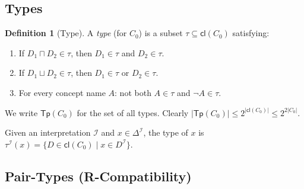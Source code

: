 \documentclass[a4paper,11pt]{article}
\theoremstyle{definition}
\newtheorem{definition}[theorem]{Definition}
\newcommand{\DeltaI}{\ensuremath{\Delta^{\mathcal{I}}}}
\newcommand{\interp}{\ensuremath{\mathcal{I}}}
\newcommand{\cl}{\ensuremath{\mathsf{cl}}}
\newcommand{\Tp}{\ensuremath{\mathsf{Tp}}}
\begin{document}
\subsection{Types}

\begin{definition}[Type]
\label{def:type}
A \emph{type} (for $C_0$) is a subset $\tau \subseteq \cl(C_0)$
satisfying:
\begin{enumerate}[label=(T\arabic*),nosep]
  \item If $D_1 \sqcap D_2 \in \tau$, then $D_1 \in \tau$ and $D_2 \in \tau$.
  \item If $D_1 \sqcup D_2 \in \tau$, then $D_1 \in \tau$ or $D_2 \in \tau$.
  \item For every concept name $A$: not both $A \in \tau$ and $\neg A \in \tau$.
\end{enumerate}
We write $\Tp(C_0)$ for the set of all types.  Clearly $|\Tp(C_0)|
\leq 2^{|\cl(C_0)|} \leq 2^{2|C_0|}$.
\end{definition}

Given an interpretation $\interp$ and $x \in \DeltaI$, the type of
$x$ is $\tau^{\interp}(x) = \{D \in \cl(C_0) \mid x \in
D^{\interp}\}$.

\subsection{Pair-Types (R-Compatibility)}
\end{document}
